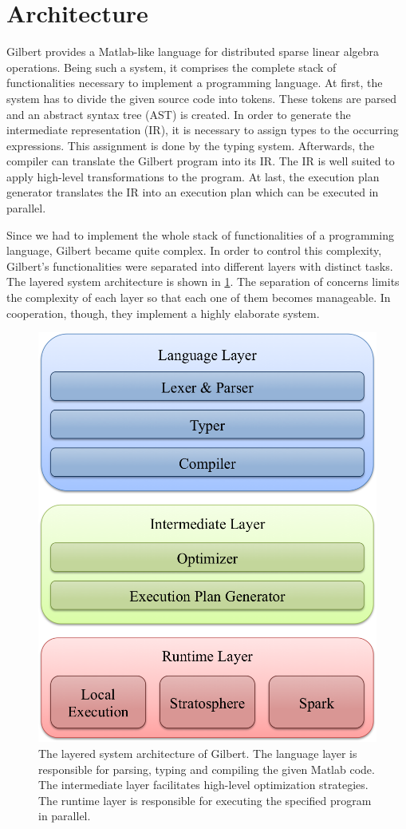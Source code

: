 \section{Architecture}
\label{cha:architecture}


Gilbert provides a Matlab-like language for distributed sparse linear algebra operations.
Being such a system, it comprises the complete stack of functionalities necessary to implement a programming language.
At first, the system has to divide the given source code into tokens.
These tokens are parsed and an abstract syntax tree (AST) is created.
In order to generate the intermediate representation (IR), it is necessary to assign types to the occurring expressions.
This assignment is done by the typing system.
Afterwards, the compiler can translate the Gilbert program into its IR.
The IR is well suited to apply high-level transformations to the program.
At last, the execution plan generator translates the IR into an execution plan which can be executed in parallel.

Since we had to implement the whole stack of functionalities of a programming language, Gilbert became quite complex.
In order to control this complexity, Gilbert's functionalities were separated into different layers with distinct tasks.
The layered system architecture is shown in \cref{fig:systemArchitecture}.
The separation of concerns limits the complexity of each layer so that each one of them becomes manageable.
In cooperation, though, they implement a highly elaborate system.

\begin{figure}
	\centering
	\includegraphics[width=0.5\linewidth]{images/systemArchitecture.png}
	\caption{The layered system architecture of Gilbert. The language layer is responsible for parsing, typing and compiling the given Matlab code. The intermediate layer facilitates high-level optimization strategies. The runtime layer is responsible for executing the specified program in parallel.}
	\label{fig:systemArchitecture}
\end{figure}

